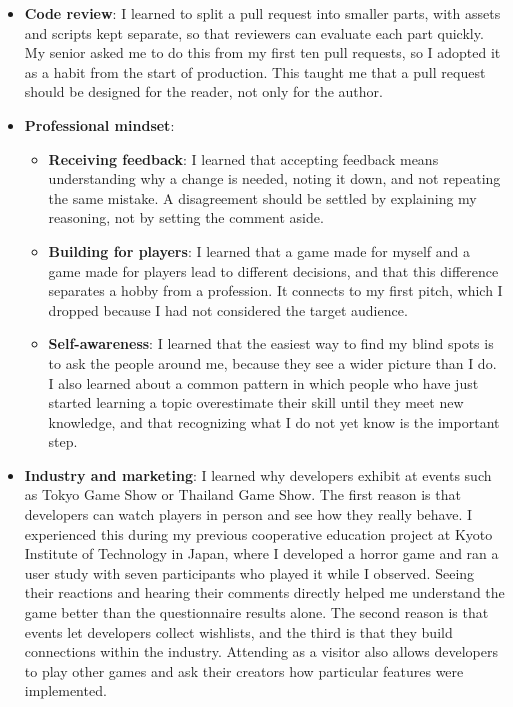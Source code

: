 \begin{itemize}[label=-]
    \item \textbf{Code review}: I learned to split a pull request into smaller parts, with assets and scripts kept separate, so that reviewers can evaluate each part quickly. My senior asked me to do this from my first ten pull requests, so I adopted it as a habit from the start of production. This taught me that a pull request should be designed for the reader, not only for the author.

    \item \textbf{Professional mindset}:
    \begin{itemize}[label=$\circ$]
        \item \textbf{Receiving feedback}: I learned that accepting feedback means understanding why a change is needed, noting it down, and not repeating the same mistake. A disagreement should be settled by explaining my reasoning, not by setting the comment aside.
        \item \textbf{Building for players}: I learned that a game made for myself and a game made for players lead to different decisions, and that this difference separates a hobby from a profession. It connects to my first pitch, which I dropped because I had not considered the target audience.
        \item \textbf{Self-awareness}: I learned that the easiest way to find my blind spots is to ask the people around me, because they see a wider picture than I do. I also learned about a common pattern in which people who have just started learning a topic overestimate their skill until they meet new knowledge, and that recognizing what I do not yet know is the important step.
    \end{itemize}
\pagebreak
    \item \textbf{Industry and marketing}: I learned why developers exhibit at events such as Tokyo Game Show or Thailand Game Show. The first reason is that developers can watch players in person and see how they really behave. I experienced this during my previous cooperative education project at Kyoto Institute of Technology in Japan, where I developed a horror game and ran a user study with seven participants who played it while I observed. Seeing their reactions and hearing their comments directly helped me understand the game better than the questionnaire results alone. The second reason is that events let developers collect wishlists, and the third is that they build connections within the industry. Attending as a visitor also allows developers to play other games and ask their creators how particular features were implemented.
\end{itemize}

